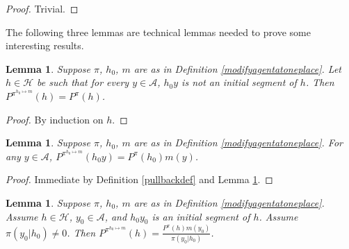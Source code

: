 \documentclass[twoside]{article}
\newtheorem{lemma}[theorem]{Lemma}
\begin{document}
\begin{proof}
    Trivial.
\end{proof}

The following three lemmas are technical lemmas needed to prove
some interesting results.

\begin{lemma}
\label{firsttechlemmaforgenericity}
    Suppose $\pi$, $h_0$, $m$ are as in Definition \ref{modifyagentatoneplace}.
    Let $h\in\mathcal H$ be such that
    for every $y\in\mathcal A$,
    $h_0y$ is not an initial segment of $h$.
    Then $P^{\pi^{h_0\mapsto m}}(h)=P^\pi(h)$.
\end{lemma}

\begin{proof}
    By induction on $h$.
\end{proof}

\begin{lemma}
\label{thirdtechlemmaforgenericity}
    Suppose $\pi$, $h_0$, $m$ are as in Definition \ref{modifyagentatoneplace}.
    For any $y\in\mathcal A$,
    $P^{\pi^{h_0\mapsto m}}(h_0y)=P^\pi(h_0)m(y)$.
\end{lemma}

\begin{proof}
    Immediate by Definition \ref{pullbackdef} and Lemma \ref{firsttechlemmaforgenericity}.
\end{proof}

\begin{lemma}
\label{secondtechlemmaforgenericity}
    Suppose $\pi$, $h_0$, $m$ are as in Definition \ref{modifyagentatoneplace}.
    Assume $h\in\mathcal H$, $y_0\in\mathcal A$, and $h_0y_0$ is
    an initial segment of $h$. Assume $\pi(y_0|h_0)\not=0$. Then
    $P^{\pi^{h_0\mapsto m}}(h) = \frac{P^\pi(h)m(y_0)}{\pi(y_0|h_0)}$.
\end{lemma}
\end{document}
